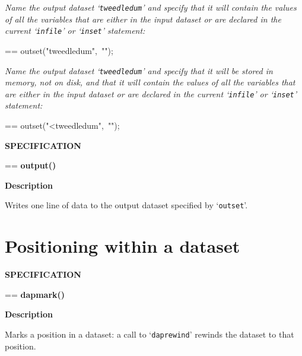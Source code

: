 \documentclass{book}
\makeatletter
\newenvironment{Texinfopreformatted}{%
  \par\GNUTobeylines\obeyspaces\frenchspacing\parskip=\z@\parindent=\z@}{}
{\catcode`\^^M=13 \gdef\GNUTobeylines{\catcode`\^^M=13 \def^^M{\null\par}}}
\newenvironment{Texinfoindented}{\begin{list}{}{}\item\relax}{\end{list}}
\renewcommand{\_}{\Texinfounderscore\discretionary{}{}{}}
\makeatother
\begin{document}
\emph{Name the output dataset `\texttt{tweedledum}' and
specify that it will contain the values of all the variables
that are either in the input dataset or are declared in
the current `\texttt{infile}' or `\texttt{inset}' statement:}
\begin{Texinfoindented}
\begin{Texinfopreformatted}%
\ttfamily outset("tweedledum",\ "");
\end{Texinfopreformatted}
\end{Texinfoindented}

\emph{Name the output dataset `\texttt{tweedledum}' and
specify that it will be stored in memory, not on disk, and
that it will contain the values of all the variables
that are either in the input dataset or are declared in
the current `\texttt{infile}' or `\texttt{inset}' statement:}
\begin{Texinfoindented}
\begin{Texinfopreformatted}%
\ttfamily outset("<tweedledum",\ "");
\end{Texinfopreformatted}
\end{Texinfoindented}

\noindent{}\textbf{SPECIFICATION}
\begin{Texinfoindented}
\begin{Texinfopreformatted}%
\textbf{output()}
\end{Texinfopreformatted}
\end{Texinfoindented}
%

\noindent{}\textbf{Description}

Writes one line of data to the output dataset specified by `\texttt{outset}'.

\section{{Positioning within a dataset}}
\label{anchor:Positioning-within-a-dataset}%

\noindent{}\textbf{SPECIFICATION}
\begin{Texinfoindented}
\begin{Texinfopreformatted}%
\textbf{dap\_mark()}
\end{Texinfopreformatted}
\end{Texinfoindented}
%
%
\index[in]{dap\_mark@dap\_mark}%

\noindent{}\textbf{Description}

Marks a position in a dataset: a call to `\texttt{dap\_rewind}' rewinds the dataset
to that position.
\end{document}

